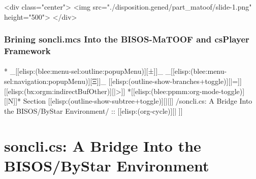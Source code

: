 \begin{whenOrg}
\begin{htmlonly}

\begin{frame}[fragile,plain,label=part_matoof]
    \frametitle{}
    \framesubtitle{}
    \begin{rawhtml}
<div class="center">
<img src="./disposition.gened/part_matoof/slide-1.png" height="500">
</div>
    \end{rawhtml}
\end{frame}
\end{htmlonly}

\begin{verblatex}

\begin{frame}[fragile,label=part_matoof]
    \frametitle{Brining soncli.mcs Into the BISOS-MaTOOF and csPlayer Framework}
    \framesubtitle{}

    \tableofcontents


\end{frame}
\end{verblatex}


\begin{whenOrg}
*  _[[elisp:(blee:menu-sel:outline:popupMenu)][±]]_ _[[elisp:(blee:menu-sel:navigation:popupMenu)][Ξ]]_ [[elisp:(outline-show-branches+toggle)][|=]] [[elisp:(bx:orgm:indirectBufOther)][|>]] *[[elisp:(blee:ppmm:org-mode-toggle)][|N]]*  Section    [[elisp:(outline-show-subtree+toggle)][||]]   /soncli.cs: A Bridge Into the BISOS/ByStar Environment/ ::  [[elisp:(org-cycle)][| ]]
\end{whenOrg}

\section{soncli.cs: A Bridge Into the BISOS/ByStar Environment}



\end{whenOrg}

